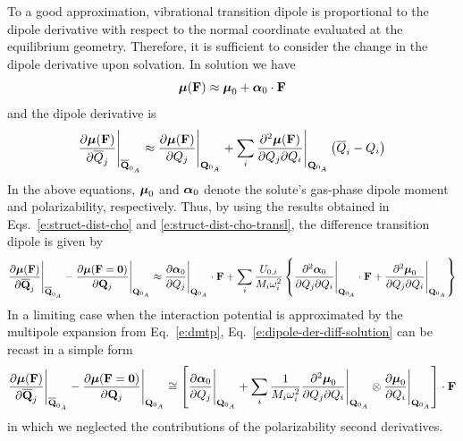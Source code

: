 \documentclass[a4paper,titlepage,twoside,fleqn,12pt]{book}
\newcommand{\BM}[1]{\ensuremath{\mbox{\boldmath${#1}$}}}
\begin{document}
\begin{refsection}
To a good approximation, vibrational transition dipole is proportional to the dipole derivative 
with respect to the normal coordinate evaluated at the equilibrium geometry.
Therefore, it is sufficient to consider the change in the dipole derivative
upon solvation. In solution we have
%
\begin{equation} \label{e:dipole-solution}
{\BM \mu}({\bf F}) \approx {\BM \mu}_0 + {\BM \alpha}_0 \cdot {\bf F}
\end{equation}
%
and the dipole derivative is
%
\begin{equation} \label{e:dipole-der-solution}
 \frac{\partial{\BM \mu}({\bf F})}{\partial\overline{Q}_j} \Bigg|_{\overline{\bf Q}_{0_A}}
\approx 
 \frac{\partial{\BM \mu}({\bf F})}{\partial Q_j} \Bigg|_{{\bf Q}_{0_A}}
+
\sum_i \frac{\partial^2{\BM \mu}({\bf F})}{\partial Q_j \partial Q_i} \Bigg|_{{\bf Q}_{0_A}}
\left( \overline{Q}_i - Q_i\right)
\end{equation}
%
In the above equations, ${\BM \mu}_0$ and ${\BM \alpha}_0$ denote 
the solute's gas\hyp{}phase dipole moment
and polarizability, respectively.
Thus, by using the results obtained in Eqs.~\eqref{e:struct-dist-cho} 
and \eqref{e:struct-dist-cho-transl},
the difference transition dipole is given by
%
\begin{equation} \label{e:dipole-der-diff-solution}
\frac{\partial{\BM \mu}({\bf F})}{\partial\overline {\bf Q}_j} \Bigg|_{\overline{\bf Q}_{0_A}} -  
 \frac{\partial{\BM \mu}({\bf F}={\bf 0})}{\partial {\bf Q}_j} \Bigg|_{{\bf Q}_{0_A}} \approx
%
\frac{\partial{\BM \alpha}_0}{\partial Q_j} \Bigg|_{{\bf Q}_{0_A}} \cdot {\bf F}
+
\sum_i \frac{U_{0,i}}{M_i\omega_i^2} 
\left\{
\frac{\partial^2{\BM \alpha}_0}{\partial Q_j \partial Q_i} \Bigg|_{{\bf Q}_{0_A}} \cdot {\bf F}
+
\frac{\partial^2{\BM \mu}_0}{\partial Q_j \partial Q_i} \Bigg|_{{\bf Q}_{0_A}}
\right\}
\end{equation}
%
In a limiting case when
the interaction potential is approximated by the multipole expansion from
Eq.~\eqref{e:dmtp}, 
Eq.~\eqref{e:dipole-der-diff-solution} can be recast 
in a simple form
%
\begin{equation} \label{e:dipole-der-diff-solution-field}
 \frac{\partial{\BM \mu}({\bf F})}{\partial\overline {\bf Q}_j} \Bigg|_{\overline{\bf Q}_{0_A}} -  
 \frac{\partial{\BM \mu}({\bf F}={\bf 0})}{\partial {\bf Q}_j} \Bigg|_{{\bf Q}_{0_A}} \cong
%
\left[
\frac{\partial {\BM \alpha}_0}{\partial Q_j} \Bigg|_{{\bf Q}_{0_A}} 
+ 
\sum_i \frac{1}{M_i\omega_i^2} 
\frac{\partial^2 {\BM \mu}_0}{\partial Q_j \partial Q_i} \Bigg|_{{\bf Q}_{0_A}}
\otimes
\frac{\partial {\BM \mu}_0}{\partial Q_i} \Bigg|_{{\bf Q}_{0_A}}
\right] 
\cdot {\bf F}
\end{equation}
%
in which we neglected the contributions of the polarizability second derivatives.


\end{refsection}
\end{document}
